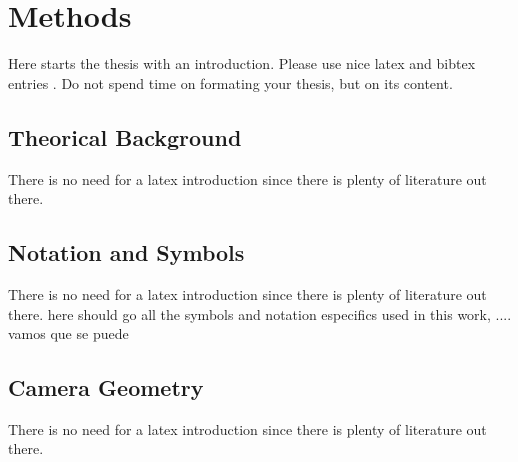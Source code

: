 \chapter{Methods}
\label{chapter:Methods}



Here starts the thesis with an introduction. Please use nice latex and bibtex entries \cite{latex}. Do not spend time on formating your thesis, but on its content. 
 
\section{Theorical Background}
There is no need for a latex introduction since there is plenty of literature out there.
 

\section{Notation and Symbols}
There is no need for a latex introduction since there is plenty of literature out there.
here should go all the symbols and notation especifics used in this work, .... vamos que se puede


\section{Camera Geometry}
There is no need for a latex introduction since there is plenty of literature out there.
